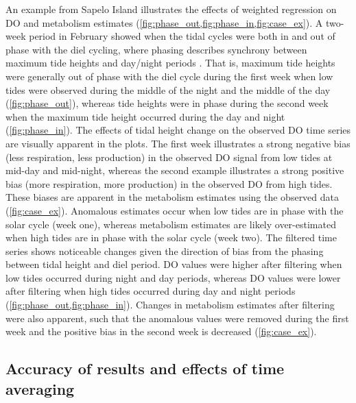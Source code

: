 \documentclass[letterpaper,12pt,oneside]{article}\usepackage[]{graphicx}\usepackage[]{color}
\begin{document}
An example from Sapelo Island illustrates the effects of weighted regression on \ac{DO} and metabolism estimates (\cref{fig:phase_out,fig:phase_in,fig:case_ex}).   A two-week period in February showed when the tidal cycles were both in and out of phase with the diel cycling, where phasing describes synchrony between maximum tide heights and day/night periods \citep{Nidzieko14}.  That is, maximum tide heights were generally out of phase with the diel cycle during the first week when low tides were observed during the middle of the night and the middle of the day (\cref{fig:phase_out}), whereas tide heights were in phase during the second week when the maximum tide height occurred during the day and night (\cref{fig:phase_in}).  The effects of tidal height change on the observed \ac{DO} time series are visually apparent in the plots. The first week illustrates a strong negative bias (less respiration, less production) in the observed \ac{DO} signal from low tides at mid-day and mid-night, whereas the second example illustrates a strong positive bias (more respiration, more production) in the observed \ac{DO} from high tides. These biases are apparent in the metabolism estimates using the observed data (\cref{fig:case_ex}).  Anomalous estimates occur when low tides are in phase with the solar cycle (week one), whereas metabolism estimates are likely over-estimated when high tides are in phase with the solar cycle (week two).  The filtered time series shows noticeable changes given the direction of bias from the phasing between tidal height and diel period.  \ac{DO} values were higher after filtering when low tides occurred during night and day periods, whereas \ac{DO} values were lower after filtering when high tides occurred during day and night periods (\cref{fig:phase_out,fig:phase_in}).  Changes in metabolism estimates after filtering were also apparent, such that the anomalous values were removed during the first week and the positive bias in the second week is decreased (\cref{fig:case_ex}).

\subsection{Accuracy of results and effects of time averaging}
\end{document}
